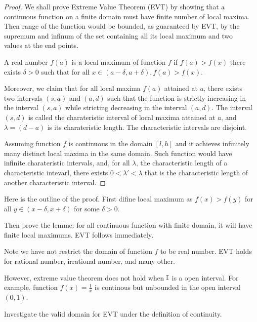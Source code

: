 \documentclass[../note.tex]{subfiles}
\begin{document}
\begin{proof}
	We shall prove Extreme Value Theorem (EVT) by showing that a continuous function on a finite domain must have finite number of local maxima. Then range of the function would be bounded, as guaranteed by EVT, by the supremum and infinum of the set containing all its local maximum and two values at the end points.

	A real number $f(a)$ is a local maximum of function $f$ if $f(a)>f(x)$ there exists $\delta > 0$ such that for all $x \in(a-\delta, a+\delta), f(a)>f(x)$. 

	Moreover, we claim that for all local maxima $f(a)$ attained at $a$, there exists two intervals $(s, a)$ and $(a, d)$ such that the function is strictly increasing in the interval $(s,a)$ while stricting decreasing in the interval $(a,d)$. 
	The interval $(s,d)$ is called the charateristic interval of local maxima attained at $a$, and $\lambda = (d-a)$ is its charateristic length. The characteristic intervals are disjoint.
	
	Assuming function $f$ is continuous in the domain $[l, h]$ and it achieves infinitely many distinct local maxima in the same domain. Such function would have infinite charateristic intervals, and, for all $\lambda$, the characteristic length of a characteristic intevarl, there exists $0<\lambda '<\lambda$ that is the characteristic length of another characteristic interval.

\end{proof}

\begin{remark}
	Here is the outline of the proof. 
	First difine local maximum as $f(x) > f(y)$ for all $y \in (x-\delta, x+\delta)$ for some $\delta > 0$. 
	
	Then prove the lemme: for all continuous function with finite domain, it will have finite local maximums. EVT follows immediately.

	Note we have not restrict the domain of function $f$ to be real number. EVT holds for rational number, irrational number, and many other.

	However, extreme value theorem does not hold when $\mathbb{I}$ is a open interval. For example, function $f(x)=\frac{1}{x}$ is continous but unbounded in the open interval $(0,1)$.
\end{remark}

\begin{hypothesis}
	Investigate the valid domain for EVT under the definition of continuity. 
\end{hypothesis}
\end{document}
